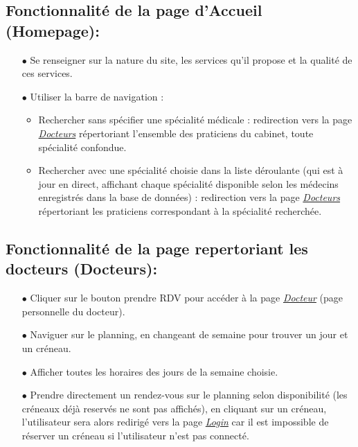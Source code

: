 \documentclass[a4paper]{report}
\begin{document}
\subsection{Fonctionnalité de la page d'Accueil (Homepage):}\label{homepage}
    \begin{itemize}
        \item[$\bullet$] Se renseigner sur la nature du site, les services qu’il propose et la qualité de ces services.
        \item[$\bullet$] Utiliser la barre de navigation :
        \begin{itemize}
            \item Rechercher sans spécifier une spécialité médicale : redirection vers la page \textit{\hyperref[docteurs]{Docteurs}} répertoriant l’ensemble des praticiens du cabinet, toute spécialité confondue.
            \item Rechercher avec une spécialité choisie dans la liste déroulante (qui est à jour en direct, affichant chaque spécialité disponible selon les médecins enregistrés dans la base de données) : redirection vers la page \textit{\hyperref[docteurs]{Docteurs}} répertoriant les praticiens correspondant à la spécialité recherchée.
        \end{itemize}
    \end{itemize}
    \vspace{3mm}

\subsection{Fonctionnalité de la page repertoriant les docteurs (Docteurs):}\label{docteurs}
    \begin{itemize}
        \item[$\bullet$] Cliquer sur le bouton prendre RDV pour accéder à la page \textit{\hyperref[docteur]{Docteur}} (page personnelle du docteur).
        \item[$\bullet$] Naviguer sur le planning, en changeant de semaine pour trouver un jour et un créneau.
        \item[$\bullet$] Afficher toutes les horaires des jours de la semaine choisie.
        \item[$\bullet$] Prendre directement un rendez-vous sur le planning selon disponibilité (les créneaux déjà reservés ne sont pas affichés), en cliquant sur un créneau, l’utilisateur sera alors redirigé vers la page \textit{\hyperref[login]{Login}} car il est impossible de réserver un créneau si l'utilisateur n'est pas connecté.
    \end{itemize}
    \vspace{3mm}
\end{document}
